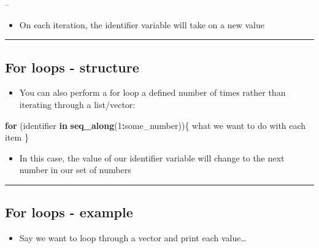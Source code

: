 \documentclass[]{article}
\newenvironment{Shaded}{\begin{snugshade}}{\end{snugshade}}
\newcommand{\ControlFlowTok}[1]{\textcolor[rgb]{0.13,0.29,0.53}{\textbf{#1}}}
\newcommand{\DecValTok}[1]{\textcolor[rgb]{0.00,0.00,0.81}{#1}}
\newcommand{\KeywordTok}[1]{\textcolor[rgb]{0.13,0.29,0.53}{\textbf{#1}}}
\newcommand{\NormalTok}[1]{#1}
\newcommand{\OperatorTok}[1]{\textcolor[rgb]{0.81,0.36,0.00}{\textbf{#1}}}
\providecommand{\tightlist}{%
  \setlength{\itemsep}{0pt}\setlength{\parskip}{0pt}}
\begin{document}
--

\begin{itemize}
\tightlist
\item
  On each iteration, the identifier variable will take on a new value
\end{itemize}

\begin{center}\rule{0.5\linewidth}{\linethickness}\end{center}

\hypertarget{for-loops---structure}{%
\subsection{For loops - structure}\label{for-loops---structure}}

\begin{itemize}
\tightlist
\item
  You can also perform a for loop a defined number of times rather than
  iterating through a list/vector:
\end{itemize}

\begin{Shaded}
\begin{Highlighting}[]
\ControlFlowTok{for}\NormalTok{ (identifier }\ControlFlowTok{in} \KeywordTok{seq_along}\NormalTok{(}\DecValTok{1}\OperatorTok{:}\NormalTok{some_number))\{}
\NormalTok{  what we want to do with each item}
\NormalTok{\}}
\end{Highlighting}
\end{Shaded}

\begin{itemize}
\tightlist
\item
  In this case, the value of our identifier variable will change to the
  next number in our set of numbers
\end{itemize}

\begin{center}\rule{0.5\linewidth}{\linethickness}\end{center}

\hypertarget{for-loops---example}{%
\subsection{For loops - example}\label{for-loops---example}}

\begin{itemize}
\tightlist
\item
  Say we want to loop through a vector and print each value\ldots{}
\end{itemize}
\end{document}
